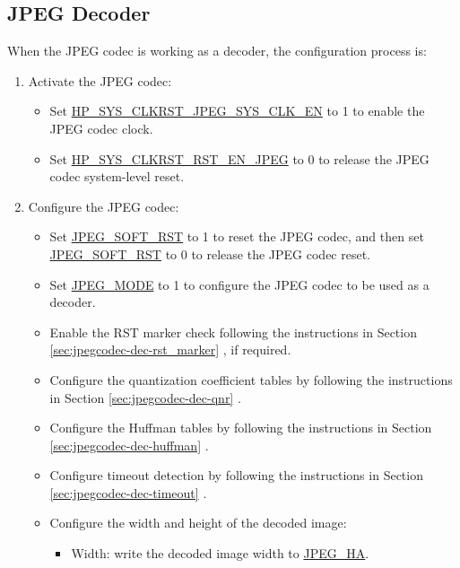 \documentclass[main\_\_EN.tex]{subfiles}
\begin{document}
\subsection{JPEG Decoder}
\label{sec:jpegcodec-dec-prog}

When the JPEG codec is working as a decoder, the configuration process is:
\begin{enumerate}
    \item Activate the JPEG codec:
    \begin{itemize}
        \item Set \hyperref[fielddesc:HPSYSCLKRSTJPEGSYSCLKEN]{HP\_SYS\_CLKRST\_JPEG\_SYS\_CLK\_EN} to 1 to enable the JPEG codec clock.
        \item Set \hyperref[fielddesc:HPSYSCLKRSTRSTENJPEG]{HP\_SYS\_CLKRST\_RST\_EN\_JPEG} to 0 to release the JPEG codec system-level reset.
    \end{itemize}
    \item Configure the JPEG codec:
    \begin{itemize}
        \item Set \hyperref[fielddesc:JPEGSOFTRST]{JPEG\_SOFT\_RST} to 1 to reset the JPEG codec, and then set \hyperref[fielddesc:JPEGSOFTRST]{JPEG\_SOFT\_RST} to 0 to release the JPEG codec reset.
        \item Set \hyperref[fielddesc:JPEGMODE]{JPEG\_MODE} to 1 to configure the JPEG codec to be used as a decoder.
        \item Enable the RST marker check following the instructions in Section \ref{sec:jpegcodec-dec-rst_marker} \textit{}, if required.
        \item Configure the quantization coefficient tables by following the instructions in Section \ref{sec:jpegcodec-dec-qnr} \textit{}.
        \item Configure the Huffman tables by following the instructions in Section \ref{sec:jpegcodec-dec-huffman} \textit{}.
        \item Configure timeout detection by following the instructions in Section \ref{sec:jpegcodec-dec-timeout} \textit{}.
        \item Configure the width and height of the decoded image:
        \begin{itemize}
            \item Width: write the decoded image width to \hyperref[fielddesc:JPEGHA]{JPEG\_HA}.

\end{itemize}
\end{itemize}
\end{enumerate}
\end{document}
